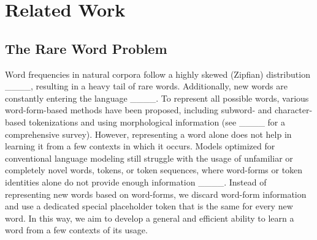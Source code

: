 \section{Related Work}
\label{sec:related-work}

\subsection{The Rare Word Problem}
Word frequencies in natural corpora follow a highly skewed (Zipfian) distribution ____, resulting in a heavy tail of rare words. Additionally, new words are constantly entering the language ____.
To represent all possible words, various word-form-based methods have been proposed, including subword- and character-based tokenizations and using morphological information (see ____ for a comprehensive survey).
However, representing a word alone does not help in learning it from a few contexts in which it occurs.
Models optimized for conventional language modeling still struggle with the usage of unfamiliar or completely novel words, tokens, or token sequences, where word-forms or token identities alone do not provide enough information ____.
Instead of representing new words based on word-forms, we discard word-form information and use a dedicated special placeholder token that is the same for every new word. In this way, we aim to develop a general and efficient ability to learn a word from a few contexts of its usage.

